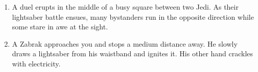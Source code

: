 \documentclass{article}
\begin{document}
\begin{enumerate}
	\item A duel erupts in the middle of a busy square between two Jedi. As their lightsaber battle ensues, many bystanders run in the opposite direction while some stare in awe at the sight.
	\item A Zabrak approaches you and stops a medium distance away. He slowly draws a lightsaber from his waistband and ignites it. His other hand crackles with electricity.
\end{enumerate}
\end{document}
